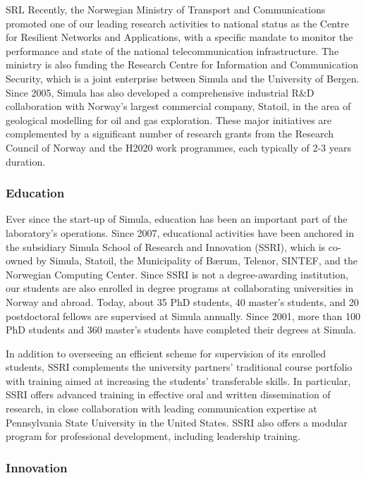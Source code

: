 \begin{sitedescription}{SRL}
Recently, the Norwegian Ministry of Transport and Communications promoted one of our leading research activities to national status as the Centre for Resilient Networks and Applications, with a specific mandate to monitor the performance and state of the national telecommunication infrastructure. The ministry is also funding the Research Centre for Information and Communication Security, which is a joint enterprise between Simula and the University of Bergen. Since 2005, Simula has also developed a comprehensive industrial R\&D collaboration with Norway’s largest commercial company, Statoil, in the area of geological modelling for oil and gas exploration. These major initiatives are complemented by a significant number of research grants from the Research Council of Norway and the H2020 work programmes, each typically of 2-3 years duration.

\subsubsection*{Education}

Ever since the start-up of Simula, education has been an important part of the laboratory’s operations. Since 2007, educational activities have been anchored in the subsidiary Simula School of Research and Innovation (SSRI), which is co-owned by Simula, Statoil, the Municipality of Bærum, Telenor, SINTEF, and the Norwegian Computing Center. Since SSRI is not a degree-awarding institution, our students are also enrolled in degree programs at collaborating universities in Norway and abroad. Today, about 35 PhD students, 40 master’s students, and 20 postdoctoral fellows are supervised at Simula annually. Since 2001, more than 100 PhD students and 360 master’s students have completed their degrees at Simula.

In addition to overseeing an efficient scheme for supervision of its enrolled students, SSRI complements the university partners’ traditional course portfolio with training aimed at increasing the students’ transferable skills.  In particular, SSRI offers advanced training in effective oral and written dissemination of research, in close collaboration with leading communication expertise at Pennsylvania State University in the United States. SSRI also offers a modular program for professional development, including leadership training.

\subsubsection*{Innovation}


\end{sitedescription}
